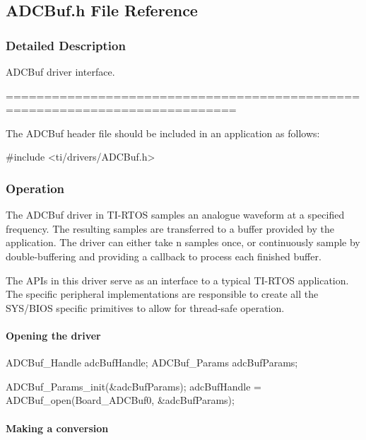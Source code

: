 \subsection{A\+D\+C\+Buf.\+h File Reference}
\label{_a_d_c_buf_8h}


\subsubsection{Detailed Description}
A\+D\+C\+Buf driver interface. 

============================================================================

The A\+D\+C\+Buf header file should be included in an application as follows\+: 
\begin{DoxyCode}
\textcolor{preprocessor}{#include <ti/drivers/ADCBuf.h>}
\end{DoxyCode}


\subsubsection*{Operation}

The A\+D\+C\+Buf driver in T\+I-\/\+R\+T\+O\+S samples an analogue waveform at a specified frequency. The resulting samples are transferred to a buffer provided by the application. The driver can either take n samples once, or continuously sample by double-\/buffering and providing a callback to process each finished buffer.

The A\+P\+Is in this driver serve as an interface to a typical T\+I-\/\+R\+T\+O\+S application. The specific peripheral implementations are responsible to create all the S\+Y\+S/\+B\+I\+O\+S specific primitives to allow for thread-\/safe operation.

\paragraph*{Opening the driver}


\begin{DoxyCode}
ADCBuf_Handle adcBufHandle;
ADCBuf_Params adcBufParams;

ADCBuf_Params_init(&adcBufParams);
adcBufHandle = ADCBuf_open(Board\_ADCBuf0, &adcBufParams);
\end{DoxyCode}


\paragraph*{Making a conversion}

